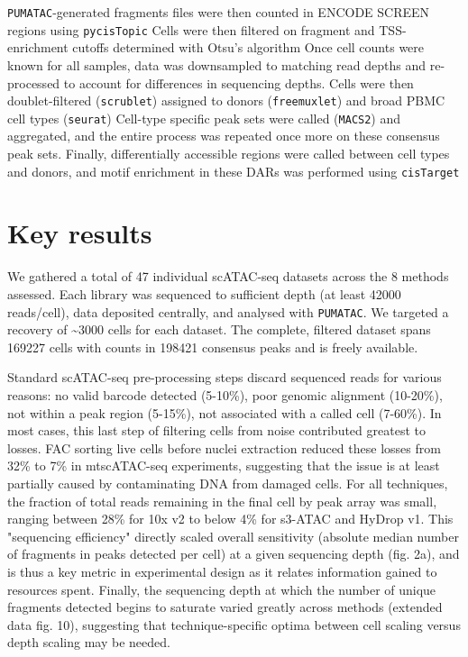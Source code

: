\verb|PUMATAC|-generated fragments files were then counted in ENCODE SCREEN regions using \verb|pycisTopic| Cells were then filtered on fragment and TSS-enrichment cutoffs determined with Otsu's algorithm Once cell counts were known for all samples, data was downsampled to matching read depths and re-processed to account for differences in sequencing depths. Cells were then doublet-filtered (\verb|scrublet|) assigned to donors (\verb|freemuxlet|) and broad PBMC cell types (\verb|seurat|) Cell-type specific peak sets were called (\verb|MACS2|) and aggregated, and the entire process was repeated once more on these consensus peak sets. Finally, differentially accessible regions were called between cell types and donors, and motif enrichment in these DARs was performed using \verb|cisTarget|

\section{Key results}
We gathered a total of 47 individual scATAC-seq datasets across the 8 methods assessed. Each library was sequenced to sufficient depth (at least \num{42000} reads/cell), data deposited centrally, and analysed with \verb|PUMATAC|. We targeted a recovery of \textasciitilde{3000} cells for each dataset. The complete, filtered dataset spans \num{169227} cells with counts in \num{198421} consensus peaks and is freely available.

Standard scATAC-seq pre-processing steps discard sequenced reads for various reasons: no valid barcode detected (5-10\%), poor genomic alignment (10-20\%), not within a peak region (5-15\%), not associated with a called cell (7-60\%). In most cases, this last step of filtering cells from noise contributed greatest to losses. FAC sorting live cells before nuclei extraction reduced these losses from 32\% to 7\% in mtscATAC-seq experiments, suggesting that the issue is at least partially caused by contaminating DNA from damaged cells. For all techniques, the fraction of total reads remaining in the final cell by peak array was small, ranging between \num{28}\% for 10x v2 to below \num{4}\% for s3-ATAC and HyDrop v1. This "sequencing efficiency" directly scaled overall sensitivity (absolute median number of fragments in peaks detected per cell) at a given sequencing depth (fig. 2a), and is thus a key metric in experimental design as it relates information gained to resources spent. Finally, the sequencing depth at which the number of unique fragments detected begins to saturate varied greatly across methods (extended data fig. 10), suggesting that technique-specific optima between cell scaling versus depth scaling may be needed.

